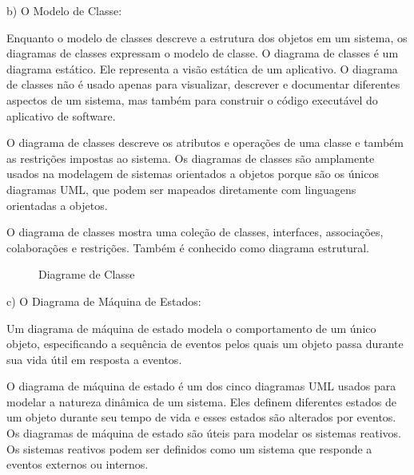 b)	O Modelo de Classe:

 Enquanto o modelo de classes descreve a estrutura dos objetos em um sistema, os diagramas de classes expressam o modelo de classe. O diagrama de classes é um diagrama estático. Ele representa a visão estática de um aplicativo. O diagrama de classes não é usado apenas para visualizar, descrever e documentar diferentes aspectos de um sistema, mas também para construir o código executável do aplicativo de software.
 
O diagrama de classes descreve os atributos e operações de uma classe e também as restrições impostas ao sistema. Os diagramas de classes são amplamente usados na modelagem de sistemas orientados a objetos porque são os únicos diagramas UML, que podem ser mapeados diretamente com linguagens orientadas a objetos.

O diagrama de classes mostra uma coleção de classes, interfaces, associações, colaborações e restrições. Também é conhecido como diagrama estrutural.

\begin{figure}[!htb]
    \centering
    \begin{minipage}{\wd0}
        \caption{Diagrame de Classe}
        \label{fig:figura3}
    \end{minipage}
\end{figure}

c) O Diagrama de Máquina de Estados:

Um diagrama de máquina de estado modela o comportamento de um único objeto, especificando a sequência de eventos pelos quais um objeto passa durante sua vida útil em resposta a eventos. 

O diagrama de máquina de estado é um dos cinco diagramas UML usados para modelar a natureza dinâmica de um sistema. Eles definem diferentes estados de um objeto durante seu tempo de vida e esses estados são alterados por eventos. Os diagramas de máquina de estado são úteis para modelar os sistemas reativos. Os sistemas reativos podem ser definidos como um sistema que responde a eventos externos ou internos.

